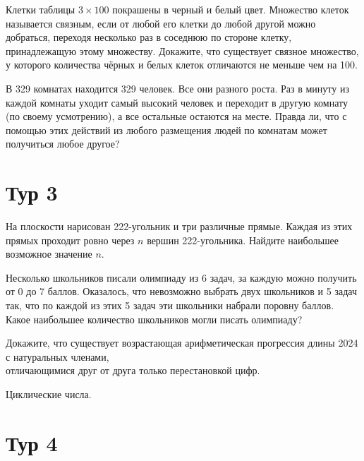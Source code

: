 \documentclass[11pt, a4paper]{common/document_template}
\begin{document}
\begin{exercise}
Клетки таблицы $3 \times 100$ покрашены в черный и белый цвет. Множество клеток называется связным, если от любой его клетки до любой другой можно добраться, переходя несколько раз в соседнюю по стороне клетку, принадлежащую этому множеству. Докажите, что существует связное множество, у которого количества чёрных и белых клеток отличаются не меньше чем на 100.
\end{exercise}

\begin{exercise}
В 329 комнатах находится 329 человек. Все они разного роста. Раз в минуту из каждой комнаты уходит самый высокий человек и переходит в другую комнату (по своему усмотрению), а все остальные остаются на месте. Правда ли, что с помощью этих действий из любого размещения людей по комнатам может получиться любое другое?
\end{exercise}

\section{Тур 3}

\begin{exercise}
На плоскости нарисован 222-угольник и три различные прямые. Каждая из этих прямых проходит ровно через $n$ вершин 222-угольника. Найдите наибольшее возможное значение $n$.
\end{exercise}

\begin{exercise}
Несколько школьников писали олимпиаду из 6 задач, за каждую можно получить от 0 до 7 баллов. Оказалось, что невозможно выбрать двух школьников и 5 задач так, что по каждой из этих 5 задач эти школьники набрали поровну баллов. Какое наибольшее количество школьников могли писать олимпиаду?
\end{exercise}

\begin{exercise}
Докажите, что существует возрастающая арифметическая прогрессия длины 2024 с натуральных членами, \\ отличающимися друг от друга только перестановкой цифр.
\end{exercise}

\begin{Solution}
Циклические числа.
\end{Solution}

\section{Тур 4}
\end{document}
